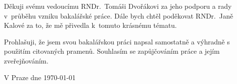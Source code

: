 \noindent Děkuji svému vedoucímu RNDr.~Tomáši Dvořákovi za jeho podporu a rady v~průběhu vzniku bakalářské práce. Dále bych chtěl poděkovat RNDr.~Janě Kalové za to, že mě přivedla
k~tomuto krásnému tématu.

\vspace{\fill} %
\noindent Prohlašuji, že jsem svou bakalářskou práci napsal samostatně a výhradně s použitím citovaných pramenů. Souhlasím se zapůjčováním práce a jejím zveřejňováním.

\bigskip
\noindent V Praze dne \today\hspace{\fill}\bcAuthor\\ %

\cleardoublepage
\tableofcontents %


